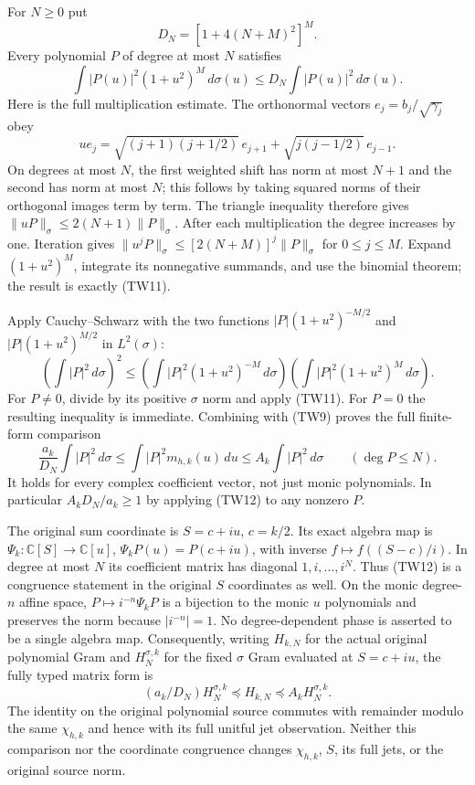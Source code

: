 For $N\geq0$ put
\[
 D_N=[1+4(N+M)^2]^M.
\]
Every polynomial $P$ of degree at most $N$ satisfies
\[
 \int |P(u)|^2(1+u^2)^M\,d\sigma(u)
 \leq D_N\int |P(u)|^2\,d\sigma(u).
 \tag{TW11}
\]
Here is the full multiplication estimate.  The orthonormal vectors
$e_j=b_j/\sqrt{\gamma_j}$ obey
\[
 u e_j=\sqrt{(j+1)(j+1/2)}\,e_{j+1}
       +\sqrt{j(j-1/2)}\,e_{j-1}.
\]
On degrees at most $N$, the first weighted shift has norm at most
$N+1$ and the second has norm at most $N$; this follows by taking
squared norms of their orthogonal images term by term.
The triangle inequality therefore gives
$\|uP\|_\sigma\leq2(N+1)\|P\|_\sigma$.
After each multiplication the degree increases by one.  Iteration gives
$\|u^jP\|_\sigma\leq[2(N+M)]^j\|P\|_\sigma$ for $0\leq j\leq M$.
Expand $(1+u^2)^M$, integrate its nonnegative summands, and use the
binomial theorem; the result is exactly (TW11).

Apply Cauchy--Schwarz with the two functions
$|P|(1+u^2)^{-M/2}$ and $|P|(1+u^2)^{M/2}$ in $L^2(\sigma)$:
\[
 \left(\int|P|^2\,d\sigma\right)^2
 \leq\left(\int|P|^2(1+u^2)^{-M}\,d\sigma\right)
       \left(\int|P|^2(1+u^2)^M\,d\sigma\right).
\]
For $P\ne0$, divide by its positive $\sigma$ norm and apply (TW11).
For $P=0$ the resulting inequality is immediate.
Combining with (TW9) proves the full finite-form comparison
\[
 \boxed{
 \frac{a_k}{D_N}\int|P|^2\,d\sigma
 \leq\int|P|^2m_{h,k}(u)\,du
 \leq A_k\int|P|^2\,d\sigma
 \qquad(\deg P\leq N).}
 \tag{TW12}
\]
It holds for every complex coefficient vector, not just monic polynomials.
In particular $A_kD_N/a_k\geq1$ by applying (TW12) to any nonzero $P$.

The original sum coordinate is $S=c+iu$, $c=k/2$.  Its exact algebra
map is $\Psi_k:\mathbb C[S]\to\mathbb C[u]$,
$\Psi_k P(u)=P(c+iu)$, with inverse $f\mapsto f((S-c)/i)$.
In degree at most $N$ its coefficient matrix has diagonal
$1,i,\ldots,i^N$.  Thus (TW12) is a congruence statement in the
original $S$ coordinates as well.  On the monic degree-$n$ affine
space, $P\mapsto i^{-n}\Psi_kP$ is a bijection to the monic $u$
polynomials and preserves the norm because $|i^{-n}|=1$.
No degree-dependent phase is asserted to be a single algebra map.
Consequently, writing $H_{k,N}$ for the actual original polynomial
Gram and $H_{N}^{\sigma,k}$ for the fixed $\sigma$ Gram evaluated at
$S=c+iu$, the fully typed matrix form is
\[
 \boxed{(a_k/D_N)H_N^{\sigma,k}\preceq H_{k,N}
 \preceq A_kH_N^{\sigma,k}.}\tag{TW13}
\]
The identity on the original polynomial source commutes with remainder
modulo the same $\chi_{h,k}$ and hence with its full unitful jet
observation.  Neither this comparison nor the coordinate congruence
changes $\chi_{h,k}$, $S$, its full jets, or the original source norm.

